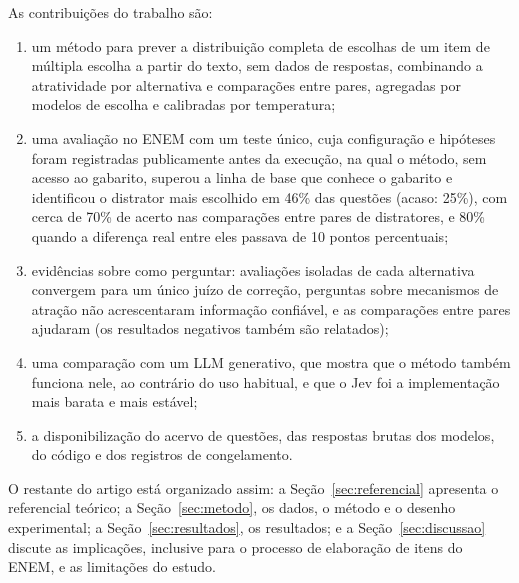 As contribuições do trabalho são:
\begin{enumerate}[nosep]
  \item um método para prever a distribuição completa de escolhas de um item de múltipla escolha a partir do texto, sem dados de respostas, combinando a atratividade por alternativa e comparações entre pares, agregadas por modelos de escolha e calibradas por temperatura;
  \item uma avaliação no ENEM com um teste único, cuja configuração e hipóteses foram registradas publicamente antes da execução, na qual o método, sem acesso ao gabarito, superou a linha de base que conhece o gabarito e identificou o distrator mais escolhido em 46\% das questões (acaso: 25\%), com cerca de 70\% de acerto nas comparações entre pares de distratores, e 80\% quando a diferença real entre eles passava de 10 pontos percentuais;
  \item evidências sobre como perguntar: avaliações isoladas de cada alternativa convergem para um único juízo de correção, perguntas sobre mecanismos de atração não acrescentaram informação confiável, e as comparações entre pares ajudaram (os resultados negativos também são relatados);
  \item uma comparação com um LLM generativo, que mostra que o método também funciona nele, ao contrário do uso habitual, e que o Jev foi a implementação mais barata e mais estável;
  \item a disponibilização do acervo de questões, das respostas brutas dos modelos, do código e dos registros de congelamento.
\end{enumerate}

O restante do artigo está organizado assim: a Seção~\ref{sec:referencial} apresenta o referencial teórico; a Seção~\ref{sec:metodo}, os dados, o método e o desenho experimental; a Seção~\ref{sec:resultados}, os resultados; e a Seção~\ref{sec:discussao} discute as implicações, inclusive para o processo de elaboração de itens do ENEM, e as limitações do estudo.

